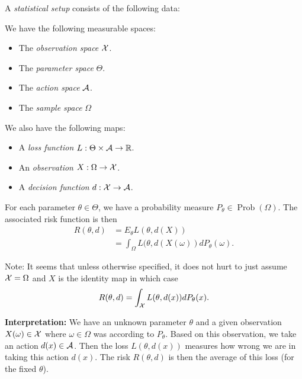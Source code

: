 \documentclass[twoside, a4paper, 10pt]{amsart}
\begin{document}
\begin{mydef} A \textit{statistical setup} consists of the following data:

We have the following measurable spaces:

\begin{itemize}
	\item The \textit{observation space} $\mathcal{X}$.
	\item The \textit{parameter space} $\Theta$.
	\item The \textit{action space} $\mathcal{A}$.
	\item The \textit{sample space} $\Omega$
\end{itemize}

We also have the following maps:

\begin{itemize}
	\item A \textit{loss function} $L:\Theta \times \mathcal{A} \to \mathbb{R}$.
	\item An \textit{observation} $X: \Omega \to \mathcal{X}$.
	\item A \textit{decision function} $d:\mathcal{X} \to \mathcal{A}$.

\end{itemize}

For each parameter $\theta \in \Theta$, we have a probability measure $P_{\theta} \in \operatorname{Prob}(\Omega)$. The associated risk function is then \begin{align*} R(\theta, d) &= E_{\theta} L(\theta, d(X)) \\ &= \int_{\Omega} L(\theta, d(X(\omega)) dP_{\theta}(\omega).\end{align*}

\end{mydef}

Note: It seems that unless otherwise specified, it does not hurt to just assume $\mathcal{X} = \Omega$ and $X$ is the identity map in which case $$R(\theta, d) = \int_{\mathcal{X}} L(\theta, d(x)) dP_{\theta}(x).$$

\textbf{Interpretation:} We have an unknown parameter $\theta$ and a given observation $X(\omega) \in \mathcal{X}$ where $\omega \in \Omega$ was according to $P_{\theta}$. Based on this observation, we take an action $d(x) \in \mathcal{A}$. Then the loss $L(\theta, d(x))$ measures how wrong we are in taking this action $d(x)$. The risk $R(\theta, d)$ is then the average of this loss (for the fixed $\theta$).
\end{document}
